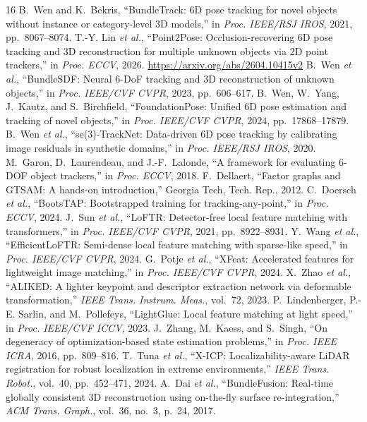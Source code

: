 \documentclass[10pt,journal]{IEEEtran}
\begin{document}
\begin{thebibliography}{16}
 B.~Wen and K.~Bekris, ``BundleTrack: 6D pose tracking for novel objects without instance or category-level 3D models,'' in \emph{Proc. IEEE/RSJ IROS}, 2021, pp.~8067--8074.
 T.-Y. Lin \emph{et al.}, ``Point2Pose: Occlusion-recovering 6D pose tracking and 3D reconstruction for multiple unknown objects via 2D point trackers,'' in \emph{Proc. ECCV}, 2026. \url{https://arxiv.org/abs/2604.10415v2}
 B.~Wen \emph{et al.}, ``BundleSDF: Neural 6-DoF tracking and 3D reconstruction of unknown objects,'' in \emph{Proc. IEEE/CVF CVPR}, 2023, pp.~606--617.
 B.~Wen, W.~Yang, J.~Kautz, and S.~Birchfield, ``FoundationPose: Unified 6D pose estimation and tracking of novel objects,'' in \emph{Proc. IEEE/CVF CVPR}, 2024, pp.~17868--17879.
 B.~Wen \emph{et al.}, ``se(3)-TrackNet: Data-driven 6D pose tracking by calibrating image residuals in synthetic domains,'' in \emph{Proc. IEEE/RSJ IROS}, 2020.
 M.~Garon, D.~Laurendeau, and J.-F.~Lalonde, ``A framework for evaluating 6-DOF object trackers,'' in \emph{Proc. ECCV}, 2018.
 F.~Dellaert, ``Factor graphs and GTSAM: A hands-on introduction,'' Georgia Tech, Tech. Rep., 2012.
 C.~Doersch \emph{et al.}, ``BootsTAP: Bootstrapped training for tracking-any-point,'' in \emph{Proc. ECCV}, 2024.
 J.~Sun \emph{et al.}, ``LoFTR: Detector-free local feature matching with transformers,'' in \emph{Proc. IEEE/CVF CVPR}, 2021, pp.~8922--8931.
 Y.~Wang \emph{et al.}, ``EfficientLoFTR: Semi-dense local feature matching with sparse-like speed,'' in \emph{Proc. IEEE/CVF CVPR}, 2024.
 G.~Potje \emph{et al.}, ``XFeat: Accelerated features for lightweight image matching,'' in \emph{Proc. IEEE/CVF CVPR}, 2024.
 X.~Zhao \emph{et al.}, ``ALIKED: A lighter keypoint and descriptor extraction network via deformable transformation,'' \emph{IEEE Trans. Instrum. Meas.}, vol.~72, 2023.
 P.~Lindenberger, P.-E. Sarlin, and M.~Pollefeys, ``LightGlue: Local feature matching at light speed,'' in \emph{Proc. IEEE/CVF ICCV}, 2023.
 J.~Zhang, M.~Kaess, and S.~Singh, ``On degeneracy of optimization-based state estimation problems,'' in \emph{Proc. IEEE ICRA}, 2016, pp.~809--816.
 T.~Tuna \emph{et al.}, ``X-ICP: Localizability-aware LiDAR registration for robust localization in extreme environments,'' \emph{IEEE Trans. Robot.}, vol.~40, pp.~452--471, 2024.
 A.~Dai \emph{et al.}, ``BundleFusion: Real-time globally consistent 3D reconstruction using on-the-fly surface re-integration,'' \emph{ACM Trans. Graph.}, vol.~36, no.~3, p.~24, 2017.
\end{thebibliography}
\end{document}
